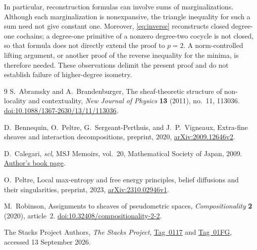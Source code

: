 \documentclass[11pt,a4paper]{article}
\numberwithin{equation}{section}
\theoremstyle{remark}
\begin{document}
In particular, reconstruction formulas can involve sums of marginalizations. Although each marginalization is nonexpansive, the triangle inequality for such a sum need not give constant one. Moreover, \eqref{eq:inverse} reconstructs closed degree-one cochains; a degree-one primitive of a nonzero degree-two cocycle is not closed, so that formula does not directly extend the proof to $p=2$. A norm-controlled lifting argument, or another proof of the reverse inequality for the minima, is therefore needed. These observations delimit the present proof and do not establish failure of higher-degree isometry.

\begin{thebibliography}{9}
S.~Abramsky and A.~Brandenburger,
The sheaf-theoretic structure of non-locality and contextuality,
\emph{New Journal of Physics} \textbf{13} (2011), no.~11, 113036.
\href{https://doi.org/10.1088/1367-2630/13/11/113036}{doi:10.1088/1367-2630/13/11/113036}.

D.~Bennequin, O.~Peltre, G.~Sergeant-Perthuis, and J.~P.~Vigneaux,
Extra-fine sheaves and interaction decompositions,
preprint, 2020, \href{https://arxiv.org/abs/2009.12646v2}{arXiv:2009.12646v2}.

D.~Calegari,
\emph{scl}, MSJ Memoirs, vol.~20,
Mathematical Society of Japan, 2009.
\href{https://math.uchicago.edu/~dannyc/books/scl/scl.html}{Author's book page}.

O.~Peltre,
Local max-entropy and free energy principles, belief diffusions and their singularities,
preprint, 2023, \href{https://arxiv.org/abs/2310.02946v1}{arXiv:2310.02946v1}.

M.~Robinson,
Assignments to sheaves of pseudometric spaces,
\emph{Compositionality} \textbf{2} (2020), article~2.
\href{https://doi.org/10.32408/compositionality-2-2}{doi:10.32408/compositionality-2-2}.

The Stacks Project Authors,
\emph{The Stacks Project},
\href{https://stacks.math.columbia.edu/tag/0117}{Tag~0117} and
\href{https://stacks.math.columbia.edu/tag/01FG}{Tag~01FG}, accessed 13 September 2026.
\end{thebibliography}
\end{document}
